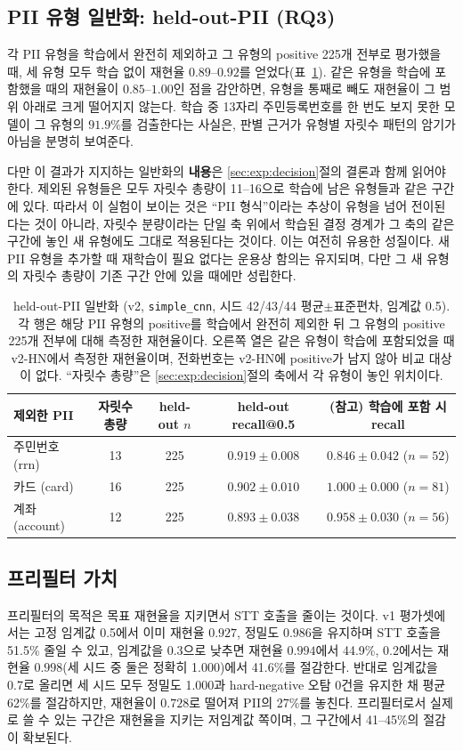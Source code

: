 \documentclass[11pt]{article}
\renewcommand{\emph}[1]{\textbf{#1}}
\begin{document}
\subsection{PII 유형 일반화: held-out-PII (RQ3)}
각 PII 유형을 학습에서 완전히 제외하고 그 유형의 positive 225개 전부로 평가했을 때, 세 유형
모두 학습 없이 재현율 $0.89$--$0.92$를 얻었다(표~\ref{tab:heldout}). 같은 유형을 학습에
포함했을 때의 재현율이 $0.85$--$1.00$인 점을 감안하면, 유형을 통째로 빼도 재현율이 그 범위
아래로 크게 떨어지지 않는다. 학습 중 13자리 주민등록번호를 한 번도 보지 못한 모델이 그 유형의
$91.9\%$를 검출한다는 사실은, 판별 근거가 유형별 자릿수 패턴의 암기가 아님을 분명히 보여준다.

다만 이 결과가 지지하는 일반화의 \emph{내용}은 \ref{sec:exp:decision}절의 결론과 함께 읽어야
한다. 제외된 유형들은 모두 자릿수 총량이 11--16으로 학습에 남은 유형들과 같은 구간에 있다.
따라서 이 실험이 보이는 것은 ``PII 형식''이라는 추상이 유형을 넘어 전이된다는 것이 아니라,
자릿수 분량이라는 단일 축 위에서 학습된 결정 경계가 그 축의 같은 구간에 놓인 새 유형에도
그대로 적용된다는 것이다. 이는 여전히 유용한 성질이다. 새 PII 유형을 추가할 때 재학습이
필요 없다는 운용상 함의는 유지되며, 다만 그 새 유형의 자릿수 총량이 기존 구간 안에 있을
때에만 성립한다.

\begin{table}[!htbp]
\centering
\caption{held-out-PII 일반화 (v2, \texttt{simple\_cnn}, 시드 42/43/44 평균$\pm$표준편차,
임계값 0.5). 각 행은 해당 PII 유형의 positive를 학습에서 완전히 제외한 뒤 그 유형의
positive 225개 전부에 대해 측정한 재현율이다. 오른쪽 열은 같은 유형이 학습에 포함되었을 때
v2-HN에서 측정한 재현율이며, 전화번호는 v2-HN에 positive가 남지 않아 비교 대상이 없다.
``자릿수 총량''은 \ref{sec:exp:decision}절의 축에서 각 유형이 놓인 위치이다.}
\label{tab:heldout}
\small
\begin{tabular}{lcccc}
\toprule
제외한 PII & 자릿수 총량 & held-out $n$ & held-out recall@0.5 & (참고) 학습에 포함 시 recall \\
\midrule
주민번호 (rrn)     & 13 & 225 & $0.919\pm0.008$ & $0.846\pm0.042$ ($n=52$) \\
카드 (card)        & 16 & 225 & $0.902\pm0.010$ & $1.000\pm0.000$ ($n=81$) \\
계좌 (account)     & 12 & 225 & $0.893\pm0.038$ & $0.958\pm0.030$ ($n=56$) \\
\bottomrule
\end{tabular}
\end{table}

\subsection{프리필터 가치}
프리필터의 목적은 목표 재현율을 지키면서 STT 호출을 줄이는 것이다. v1 평가셋에서는 고정
임계값 0.5에서 이미 재현율 $0.927$, 정밀도 $0.986$을 유지하며 STT 호출을 51.5\% 줄일 수 있고,
임계값을 0.3으로 낮추면 재현율 $0.994$에서 44.9\%, 0.2에서는 재현율 $0.998$(세 시드 중 둘은
정확히 1.000)에서 41.6\%를 절감한다. 반대로 임계값을 0.7로 올리면 세 시드 모두 정밀도
1.000과 hard-negative 오탐 0건을 유지한 채 평균 62\%를 절감하지만, 재현율이 $0.728$로
떨어져 PII의 27\%를 놓친다. 프리필터로서 실제로 쓸 수 있는 구간은 재현율을 지키는 저임계값
쪽이며, 그 구간에서 41--45\%의 절감이 확보된다.
\end{document}
